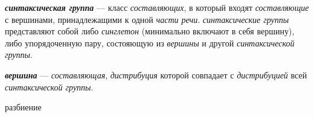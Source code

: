 \textbf{\textit{синтаксическая группа}} --- класс \textit{составляющих}, в который входят \textit{составляющие} с вершинами, принадлежащими к одной \textit{части речи}.
\textit{синтаксические группы} представляют собой либо \textit{синглетон} (минимально включают в себя вершину), либо упорядоченную пару, состояющую из \textit{вершины} и другой \textit{синтаксической группы}.

\textbf{\textit{вершина}} --- \textit{составляющая}, \textit{дистрибуция} которой совпадает с \textit{дистрибуцией} всей \textit{синтаксической группы}.

\begin{SCn}

    \begin{scnrelfromset}{разбиение}
    \end{scnrelfromset}


\end{SCn}
